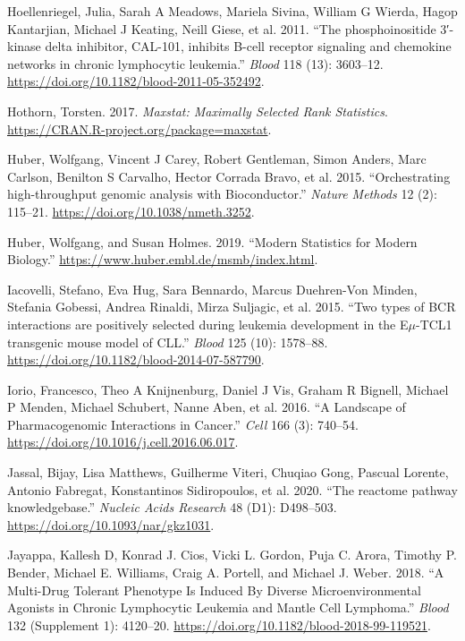 \documentclass[11pt, a4paper, twosided]{book}
\newenvironment{CSLReferences}%
  {}%
  {\par}
\begin{document}
\begin{CSLReferences}{1}{0}
\leavevmode{}%
Hoellenriegel, Julia, Sarah A Meadows, Mariela Sivina, William G Wierda, Hagop Kantarjian, Michael J Keating, Neill Giese, et al. 2011. {``{The phosphoinositide 3′-kinase delta inhibitor, CAL-101, inhibits B-cell receptor signaling and chemokine networks in chronic lymphocytic leukemia}.''} \emph{Blood} 118 (13): 3603--12. \url{https://doi.org/10.1182/blood-2011-05-352492}.

\leavevmode{}%
Hothorn, Torsten. 2017. \emph{Maxstat: Maximally Selected Rank Statistics}. \url{https://CRAN.R-project.org/package=maxstat}.

\leavevmode{}%
Huber, Wolfgang, Vincent J Carey, Robert Gentleman, Simon Anders, Marc Carlson, Benilton S Carvalho, Hector Corrada Bravo, et al. 2015. {``{Orchestrating high-throughput genomic analysis with Bioconductor}.''} \emph{Nature Methods} 12 (2): 115--21. \url{https://doi.org/10.1038/nmeth.3252}.

\leavevmode{}%
Huber, Wolfgang, and Susan Holmes. 2019. {``{Modern Statistics for Modern Biology}.''} \url{https://www.huber.embl.de/msmb/index.html}.

\leavevmode{}%
Iacovelli, Stefano, Eva Hug, Sara Bennardo, Marcus Duehren-Von Minden, Stefania Gobessi, Andrea Rinaldi, Mirza Suljagic, et al. 2015. {``{Two types of BCR interactions are positively selected during leukemia development in the E\(\mu\)-TCL1 transgenic mouse model of CLL}.''} \emph{Blood} 125 (10): 1578--88. \url{https://doi.org/10.1182/blood-2014-07-587790}.

\leavevmode{}%
Iorio, Francesco, Theo A Knijnenburg, Daniel J Vis, Graham R Bignell, Michael P Menden, Michael Schubert, Nanne Aben, et al. 2016. {``{A Landscape of Pharmacogenomic Interactions in Cancer}.''} \emph{Cell} 166 (3): 740--54. \url{https://doi.org/10.1016/j.cell.2016.06.017}.

\leavevmode{}%
Jassal, Bijay, Lisa Matthews, Guilherme Viteri, Chuqiao Gong, Pascual Lorente, Antonio Fabregat, Konstantinos Sidiropoulos, et al. 2020. {``{The reactome pathway knowledgebase}.''} \emph{Nucleic Acids Research} 48 (D1): D498--503. \url{https://doi.org/10.1093/nar/gkz1031}.

\leavevmode{}%
Jayappa, Kallesh D, Konrad J. Cios, Vicki L. Gordon, Puja C. Arora, Timothy P. Bender, Michael E. Williams, Craig A. Portell, and Michael J. Weber. 2018. {``{A Multi-Drug Tolerant Phenotype Is Induced By Diverse Microenvironmental Agonists in Chronic Lymphocytic Leukemia and Mantle Cell Lymphoma}.''} \emph{Blood} 132 (Supplement 1): 4120--20. \url{https://doi.org/10.1182/blood-2018-99-119521}.


\end{CSLReferences}
\end{document}
